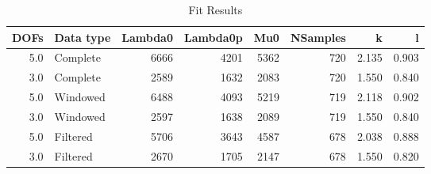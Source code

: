 \begin{table}
\centering
\caption{Fit Results}
\begin{tabular}{rlrrrrrr}
\toprule
 DOFs & Data type &  Lambda0 &  Lambda0p &   Mu0 &  NSamples &      k &      l \\
\midrule
  5.0 &  Complete &     6666 &      4201 &  5362 &       720 &  2.135 &  0.903 \\
  3.0 &  Complete &     2589 &      1632 &  2083 &       720 &  1.550 &  0.840 \\
  5.0 &  Windowed &     6488 &      4093 &  5219 &       719 &  2.118 &  0.902 \\
  3.0 &  Windowed &     2597 &      1638 &  2089 &       719 &  1.550 &  0.840 \\
  5.0 &  Filtered &     5706 &      3643 &  4587 &       678 &  2.038 &  0.888 \\
  3.0 &  Filtered &     2670 &      1705 &  2147 &       678 &  1.550 &  0.820 \\
\bottomrule
\end{tabular}
\end{table}
